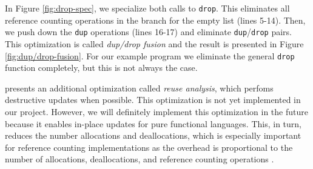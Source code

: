 \documentclass[9pt, twocolumn]{article}
\begin{document}
In Figure \ref{fig:drop-spec}, we specialize both calls to \lstinline{drop}.
This eliminates all reference counting operations in the branch for the empty list (lines 5-14).
Then, we push down the \lstinline{dup} operations (lines 16-17) and eliminate \lstinline{dup}/\lstinline{drop} pairs.
This optimization is called \emph{dup/drop fusion} and the result is presented in Figure \ref{fig:dup/drop-fusion}.
For our example program we eliminate the general \lstinline{drop} function completely, but this is not always the case. 

\citeauthor{reinking2021} presents an additional optimization called \emph{reuse analysis}, which perfoms destructive updates when possible.
This optimization is not yet implemented in our project. 
However, we will definitely implement this optimization in the future because it enables in-place updates for pure functional languages.
This, in turn, reduces the number allocations and deallocations, which is especially important for reference counting implementations as the overhead is proportional to the number of allocations, deallocations, and reference counting operations \citep{wilson1992}.
\end{document}
